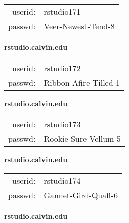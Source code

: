 \documentclass{article}\usepackage[]{graphicx}\usepackage[]{color}
\begin{document}
\begin{multicols}{3}
\begin{minipage}{.3\textwidth}
\begin{tabular}{rl}
userid: & rstudio171\\
passwd: & Veer-Newest-Tend-8

\vspace{5mm}

\end{tabular}\end{minipage}

\vspace{5mm}

\begin{minipage}{.3\textwidth}
\centerline{\textbf{rstudio.calvin.edu}}
\medskip
\begin{tabular}{rl}

userid: & rstudio172\\
passwd: & Ribbon-Afire-Tilled-1

\vspace{5mm}

\end{tabular}\end{minipage}

\vspace{5mm}

\begin{minipage}{.3\textwidth}
\centerline{\textbf{rstudio.calvin.edu}}
\medskip
\begin{tabular}{rl}

userid: & rstudio173\\
passwd: & Rookie-Sure-Vellum-5

\vspace{5mm}

\end{tabular}\end{minipage}

\vspace{5mm}

\begin{minipage}{.3\textwidth}
\centerline{\textbf{rstudio.calvin.edu}}
\medskip
\begin{tabular}{rl}

userid: & rstudio174\\
passwd: & Gannet-Gird-Quaff-6

\vspace{5mm}

\end{tabular}\end{minipage}

\vspace{5mm}

\begin{minipage}{.3\textwidth}
\centerline{\textbf{rstudio.calvin.edu}}
\medskip
\begin{tabular}{rl}


\end{tabular}
\end{minipage}
\end{multicols}
\end{document}
